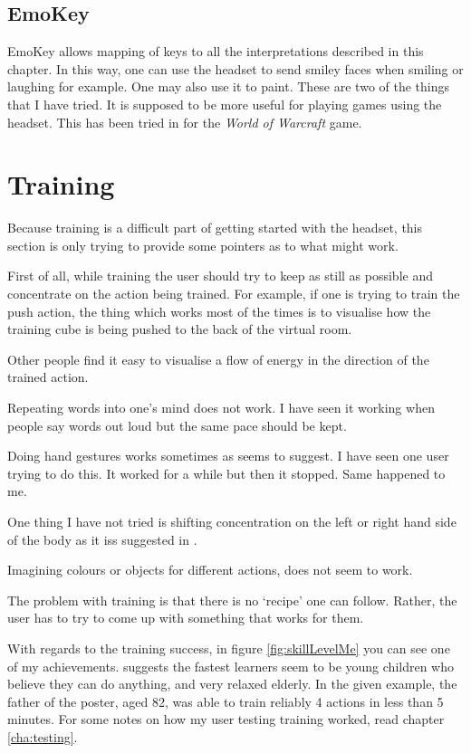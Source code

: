 \subsection{EmoKey}
EmoKey allows mapping of keys to all the interpretations described in this chapter. In this way, one can use the headset to send smiley faces when smiling or laughing for example. One may also use it to paint. These are two of the things that I have tried. It is supposed to be more useful for playing games using the headset. This has been tried in \cite{wowControl} for the \textit{World of Warcraft} game.

\section{Training}
Because training is a difficult part of getting started with the headset, this section is only trying to provide some pointers as to what might work. 

First of all, while training the user should try to keep as still as possible and concentrate on the action being trained. For example, if one is trying to train the push action, the thing which works most of the times is to visualise how the training cube is being pushed to the back of the virtual room. 

Other people find it easy to visualise a flow of energy in the direction of the trained action. 

Repeating words into one's mind does not work. I have seen it working when people say words out loud but the same pace should be kept.

Doing hand gestures works sometimes as \cite{emoTraining} seems to suggest. I have seen one user trying to do this. It worked for a while but then it stopped. Same happened to me.

One thing I have not tried is shifting concentration on the left or right hand side of the body as it iss suggested in \cite{emoTraining}.

Imagining colours or objects for different actions, does not seem to work.

The problem with training is that there is no `recipe' one can follow. Rather, the user has to try to come up with something that works for them. 

With regards to the training success, in figure \ref{fig:skillLevelMe} you can see one of my achievements. \cite{emoTraining} suggests the fastest learners seem to be young children who believe they can do anything, and very relaxed elderly. In the given example, the father of the poster, aged 82, was able to train reliably 4 actions in less than 5 minutes. For some notes on how my user testing training worked, read chapter \ref{cha:testing}.

